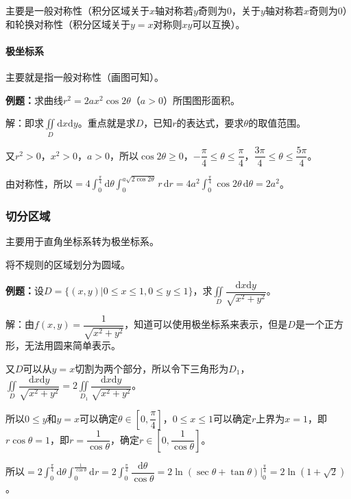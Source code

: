 \documentclass[UTF8, 12pt]{ctexart}
\begin{document}
主要是一般对称性（积分区域关于$x$轴对称若$y$奇则为0，关于$y$轴对称若$x$奇则为0）和轮换对称性（积分区域关于$y=x$对称则$xy$可以互换）。

\paragraph{极坐标系} \leavevmode \medskip

主要就是指一般对称性（画图可知）。

\textbf{例题：}求曲线$r^2=2ax^2\cos2\theta$（$a>0$）所围图形面积。

解：即求$\iint\limits_D\textrm{d}x\textrm{d}y$。重点就是求$D$，已知$r$的表达式，要求$\theta$的取值范围。

又$r^2>0$，$x^2>0$，$a>0$，所以$\cos2\theta\geqslant0$，$-\dfrac{\pi}{4}\leqslant\theta\leqslant\dfrac{\pi}{4}$，$\dfrac{3\pi}{4}\leqslant\theta\leqslant\dfrac{5\pi}{4}$。

由对称性，所以$=4\int_0^{\frac{\pi}{4}}\textrm{d}\theta\int_0^{a\sqrt{2\cos2\theta}}r\,\textrm{d}r=4a^2\int_0^{\frac{\pi}{4}}\cos2\theta\,\textrm{d}\theta=2a^2$。

\subsubsection{切分区域}

主要用于直角坐标系转为极坐标系。

将不规则的区域划分为圆域。

\textbf{例题：}设$D=\{(x,y)|0\leqslant x\leqslant1,0\leqslant y\leqslant1\}$，求$\displaystyle{\iint\limits_D\dfrac{\textrm{d}x\textrm{d}y}{\sqrt{x^2+y^2}}}$。

解：由$f(x,y)=\dfrac{1}{\sqrt{x^2+y^2}}$，知道可以使用极坐标系来表示，但是$D$是一个正方形，无法用圆来简单表示。

又$D$可以从$y=x$切割为两个部分，所以令下三角形为$D_1$，$\displaystyle{\iint\limits_D\dfrac{\textrm{d}x\textrm{d}y}{\sqrt{x^2+y^2}}}=2\displaystyle{\iint\limits_{D_1}\dfrac{\textrm{d}x\textrm{d}y}{\sqrt{x^2+y^2}}}$。

所以$0\leqslant y$和$y=x$可以确定$\theta\in\left[0,\dfrac{\pi}{4}\right]$，$0\leqslant x\leqslant1$可以确定$r$上界为$x=1$，即$r\cos\theta=1$，即$r=\dfrac{1}{\cos\theta}$，确定$r\in\left[0,\dfrac{1}{\cos\theta}\right]$。

所以$=2\int_0^{\frac{\pi}{4}}\textrm{d}\theta\int_0^{\frac{1}{\cos\theta}}\textrm{d}r=2\int_0^{\frac{\pi}{4}}\dfrac{\textrm{d}\theta}{\cos\theta}=2\ln(\sec\theta+\tan\theta)|_0^{\frac{\pi}{4}}=2\ln(1+\sqrt{2})$。
\end{document}
